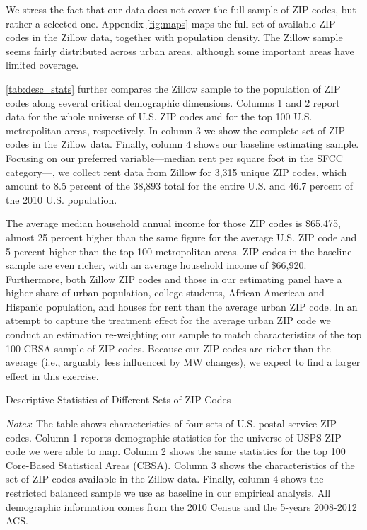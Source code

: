 We stress the fact that our data does not cover the full sample of ZIP codes, but rather 
a selected one. Appendix \autoref{fig:maps} maps the full set of available ZIP codes in 
the Zillow data, together with population density. The Zillow sample seems fairly 
distributed across urban areas, although some important areas have limited coverage. 

\autoref{tab:desc_stats} further compares the Zillow sample to the population of ZIP codes 
along several critical demographic dimensions. Columns 1 and 2 report data for the whole 
universe of U.S. ZIP codes and for the top 100 U.S. metropolitan areas, respectively. In 
column 3 we show the complete set of ZIP codes in the Zillow data. Finally, column 4 shows 
our baseline estimating sample. Focusing on our preferred variable---median rent per square 
foot in the SFCC category---, we collect rent data from Zillow for 3,315 unique ZIP codes, 
which amount to 8.5 percent of the 38,893 total for the entire U.S. and 46.7 percent 
of the 2010 U.S. population. 

The average median household annual income for those ZIP codes is \$65,475, almost 25 
percent higher than the same figure for the average U.S. ZIP code and 5 percent higher than 
the top 100 metropolitan areas. ZIP codes in the baseline sample are even richer, with an
average household income of \$66,920. Furthermore, both Zillow ZIP codes and those in our 
estimating panel have a higher share of urban population, college students, African-American
and Hispanic population, and houses for rent than the average urban ZIP code. In an attempt 
to capture the treatment effect for the average urban ZIP code we conduct an estimation 
re-weighting our sample to match characteristics of the top 100 CBSA sample of ZIP codes. 
Because our ZIP codes are richer than the average (i.e., arguably less influenced by MW
changes), we expect to find a larger effect in this exercise.

\begin{table}[h!]
	\caption{Descriptive Statistics of Different Sets of ZIP Codes}
	\centering
	\label{tab:desc_stats}    
	
	\begin{minipage}{0.95\textwidth} \footnotesize
		\vspace{3mm} 
		\textit{Notes}: The table shows characteristics of four sets of U.S. postal service 
		ZIP codes. Column 1 reports demographic statistics for the universe of USPS ZIP code 
		we were able to map. Column 2 shows the same statistics for the top 100 Core-Based 
		Statistical Areas (CBSA). Column 3 shows the characteristics of the set of ZIP codes 
		available in the Zillow data. Finally, column 4 shows the restricted balanced sample 
		we use as baseline in our empirical analysis. All demographic information comes from 
		the 2010 Census and the 5-years 2008-2012 ACS.
	\end{minipage}
\end{table}


